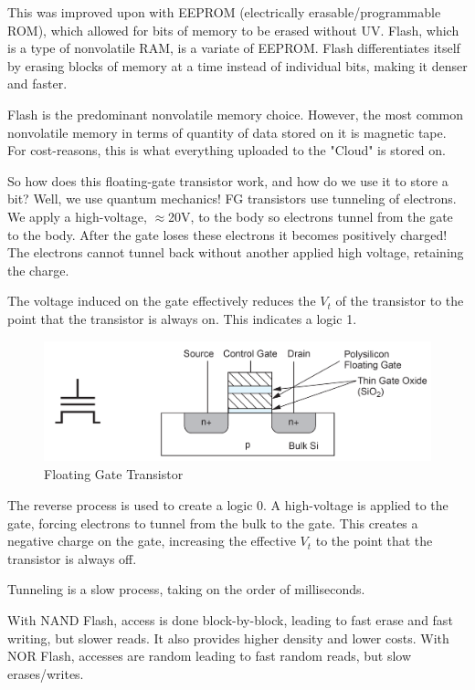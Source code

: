 \documentclass{article}
\begin{document}
This was improved upon with EEPROM (electrically erasable/programmable ROM), which allowed for bits of memory to be erased without UV. Flash, which is a type of nonvolatile RAM, is a variate of EEPROM. Flash differentiates itself by erasing blocks of memory at a time instead of individual bits, making it denser and faster. 

Flash is the predominant nonvolatile memory choice. However, the most common nonvolatile memory in terms of quantity of data stored on it is magnetic tape. For cost-reasons, this is what everything uploaded to the "Cloud" is stored on. 

So how does this floating-gate transistor work, and how do we use it to store a bit? Well, we use quantum mechanics! FG transistors use tunneling of electrons. We apply a high-voltage, $\approx$20V, to the body so electrons tunnel from the gate to the body. After the gate loses these electrons it becomes positively charged! The electrons cannot tunnel back without another applied high voltage, retaining the charge. 

The voltage induced on the gate effectively reduces the $V_t$ of the transistor to the point that the transistor is always on. This indicates a logic 1. 


\begin{figure}[ht!]
\centering
\includegraphics[height=35mm]{FG.png}
\caption{Floating Gate Transistor}
\end{figure}

The reverse process is used to create a logic 0. A high-voltage is applied to the gate, forcing electrons to tunnel from the bulk to the gate. This creates a negative charge on the gate, increasing the effective $V_t$ to the point that the transistor is always off. 

Tunneling is a slow process, taking on the order of milliseconds. 

With NAND Flash, access is done block-by-block, leading to fast erase and fast writing, but slower reads. It also provides higher density and lower costs. With NOR Flash, accesses are random leading to fast random reads, but slow erases/writes. 
\end{document}
